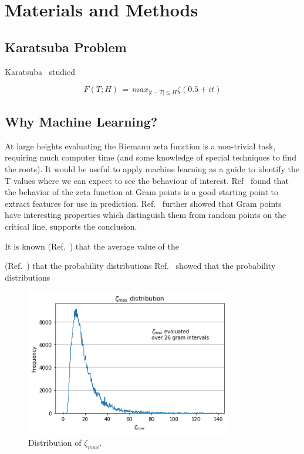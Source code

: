 \documentclass[twoside]{article}
\begin{document}
\section{\label{sec2}Materials and Methods}

\subsection{\label{seckaratsuba}Karatsuba Problem}
Karatsuba~\cite{K5} studied 

\begin{equation}
F(T; H)  \, = \, max_{|t-T| \le H} \zeta ( 0.5+it ) 
\label{eqRie}
\end{equation}


\subsection{\label{secwhy}Why Machine Learning?}

At large heights evaluating the Riemann zeta function  is a non-trivial task, requiring much computer time 
(and some knowledge of special techniques to find the roots).  It would be useful to apply
machine learning
as a guide to identify the T values where we can expect to see the behaviour of interest.
Ref~\cite{osneural} found that the behavior of the zeta function at Gram points 
is a good starting point to extract features for use in prediction. 
Ref.~\cite{Shanker 2018a} further showed that Gram points have interesting properties 
which distinguish them from random points on the critical line, supports the conclusion. 


It is known (Ref.~\cite{Shanker 2018b}) that the average value of the 

(Ref.~\cite{Shanker 2020}) that the probability distributions
Ref.~\cite{Shanker 2020} showed 
that the probability distributions 

\begin{figure}
\centering
\includegraphics[width=0.8\textwidth]{1.png}
\caption[]{ 
  Distribution of $\zeta_{max}$. 
  }
\vspace{1mm}
\label{z1}
\end{figure}
\end{document}
